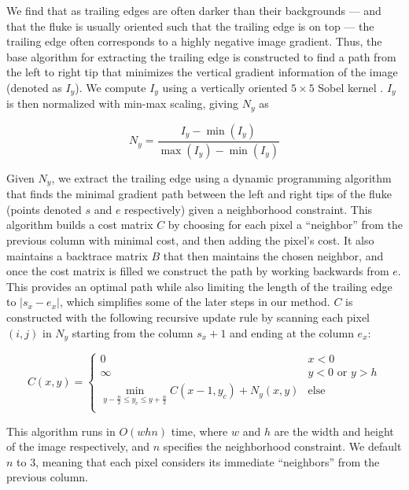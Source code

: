 We find that as trailing edges are often darker than their backgrounds --- and that the fluke is usually oriented such that the trailing edge is on top --- the trailing edge often corresponds to a highly negative image gradient.
Thus, the base algorithm for extracting the trailing edge is constructed to find a path from the left to right tip that minimizes the vertical gradient information of the image (denoted as $I_y$).
We compute $I_y$ using a vertically oriented $5 \times 5$ Sobel kernel \cite{Sobel1968}.  
$I_y$ is then normalized with min-max scaling, giving $N_y$ as

\begin{equation} \label{eqn:norm01}
N_{y} = \frac{I_y - \min(I_y)}{\max(I_y) - \min(I_y)}
\end{equation}

Given $N_y$, we extract the trailing edge using a dynamic programming algorithm that finds the minimal gradient path between the left and right tips of the fluke (points denoted $s$ and $e$ respectively) given a neighborhood constraint.
This algorithm builds a cost matrix $C$ by choosing for each pixel a ``neighbor'' from the previous column with minimal cost, and then adding the pixel's cost.
It also maintains a backtrace matrix $B$ that then maintains the chosen neighbor, and once the cost matrix is filled we construct the path by working backwards from $e$.
This provides an optimal path while also limiting the length of the trailing edge to $|s_x - e_x|$, which simplifies some of the later steps in our method.
$C$ is constructed with the following recursive update rule by scanning each pixel $(i,j)$ in $N_y$ starting from the column $s_x + 1$ and ending at the column $e_x$:

\begin{equation} \label{eqn:te_update}
C(x,y) = 
\begin{cases}
	0 & x < 0 \\
	\infty & y < 0 \text{ or } y > h \\
	\min_{y - \frac{n}{2} \leq y_c \leq y + \frac{n}{2}}C(x-1, y_c) + N_y(x,y) & \text{else} \\
\end{cases}
\end{equation}

This algorithm runs in $O(whn)$ time, where $w$ and $h$ are the width and height of the image respectively, and $n$ specifies the neighborhood constraint.
We default $n$ to $3$, meaning that each pixel considers its immediate ``neighbors'' from the previous column.



